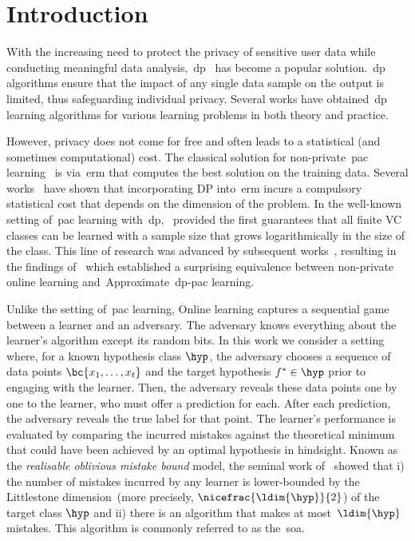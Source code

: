 \section{Introduction}
\glsresetall
With the increasing need to protect the privacy of sensitive user data while conducting meaningful data analysis,~\Gls{dp}~\citep{dwork2006calibrating} has become a popular solution.~\Gls{dp} algorithms ensure that the impact of any single data sample on the output is limited, thus safeguarding individual privacy. Several works have obtained~\Gls{dp} learning algorithms for various learning problems in both theory and practice.

However, privacy does not come for free and often leads to a statistical (and sometimes computational) cost. 
The classical solution for non-private~\Gls{pac} learning~\citep{valiant1984theory} is via~\Gls{erm} that computes the best solution on the training data. Several works~\citep{bassily2014private,chaudhuri2011differentially} have shown that incorporating DP into~\Gls{erm} incurs a compulsory statistical cost that depends on the dimension of the problem. In the well-known setting of~\Gls{pac} learning with~\Gls{dp},~\citet{kasiviswanathan2011can} provided the first guarantees that all finite VC classes can be learned with a sample size that grows logarithmically in the size of the class. This line of research was advanced by subsequent works~\citep{beimel2013characterizing,feldman2014sample,beimel2014bounds}, resulting in the findings of~\citet{alon2022private} which established a surprising equivalence between non-private online learning and~Approximate~\Gls{dp}-\Gls{pac} learning.

Unlike the setting of~\Gls{pac} learning, Online learning captures a sequential game between a learner and an adversary. 
The adversary knows everything about the learner's algorithm except its random bits. 
In this work we consider a setting where, for a known hypothesis class \(\hyp\), the adversary chooses a sequence of data points \(\bc{x_1,\ldots,x_t}\) and the target hypothesis \(f^*\in\hyp\) prior to engaging with the learner. Then, the adversary reveals these data points one by one to the learner, who must offer a prediction for each. After each prediction, the adversary reveals the true label for that point. The learner's performance is evaluated by comparing the incurred mistakes against the theoretical minimum that could have been achieved by an optimal hypothesis in hindsight. Known as the \emph{realisable oblivious mistake bound} model, the seminal work of~\citet{littlestone1988learning} showed that i) the number of mistakes incurred by any learner is lower-bounded by the Littlestone dimension~(more precisely, \(\nicefrac{\ldim{\hyp}}{2}\)) of the target class \(\hyp\) and ii) there is an algorithm that makes at most~\(\ldim{\hyp}\) mistakes. This algorithm is commonly referred to as the~\Gls{soa}.


